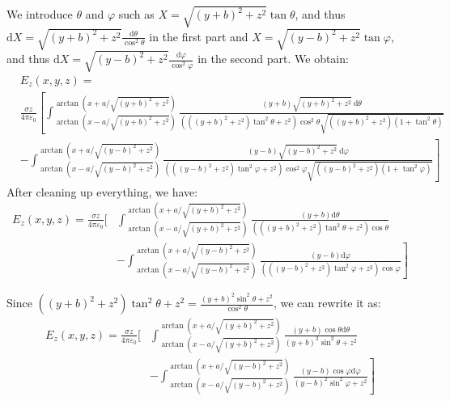 \documentclass[12pt]{article}
\begin{document}
We introduce \(\theta\) and \(\varphi\) such as \(X=\sqrt{(y+b)^2+z^2} \tan \theta\), and thus \(\mathrm{d} X=\sqrt{(y+b)^2+z^2} \frac{\mathrm{d} \theta}{\cos ^2 \theta}\) in the first part and \(X=\sqrt{(y-b)^2+z^2} \tan \varphi\), and thus \(\mathrm{d} X=\sqrt{(y-b)^2+z^2} \frac{\mathrm{d} \varphi}{\cos ^2 \varphi}\) in the second part. We obtain:
\[
\begin{aligned}
& E_z(x, y, z)=\\
&\frac{\sigma z}{4 \pi \varepsilon_0}\left[\int_{\arctan \left(x-a / \sqrt{(y+b)^2+z^2}\right)}^{\arctan \left(x+a / \sqrt{(y+b)^2+z^2}\right)} \frac{(y+b) \sqrt{(y+b)^2+z^2} \mathrm{~d} \theta}{\left(\left((y+b)^2+z^2\right) \tan ^2 \theta+z^2\right) \cos ^2 \theta \sqrt{\left((y+b)^2+z^2\right)\left(1+\tan ^2 \theta\right)}}\right. \\
&\left.-\int_{\arctan \left(x-a / \sqrt{(y-b)^2+z^2}\right)}^{\arctan \left(x+a / \sqrt{(y-b)^2+z^2}\right)} \frac{(y-b) \sqrt{(y-b)^2+z^2} \mathrm{~d} \varphi}{\left(\left((y-b)^2+z^2\right) \tan ^2 \varphi+z^2\right) \cos ^2 \varphi \sqrt{\left((y-b)^2+z^2\right)\left(1+\tan ^2 \varphi\right)}}\right]
\end{aligned}
\]
After cleaning up everything, we have:
\[
\begin{aligned}
E_z(x, y, z)=\frac{\sigma z}{4 \pi \varepsilon_0}[ & \int_{\arctan \left(x-a / \sqrt{(y+b)^2+z^2}\right)}^{\arctan \left(x+a / \sqrt{(y+b)^2+z^2}\right)} \frac{(y+b) \mathrm{d} \theta}{\left(\left((y+b)^2+z^2\right) \tan ^2 \theta+z^2\right) \cos \theta} \\
& \left.-\int_{\arctan \left(x-a / \sqrt{(y-b)^2+z^2}\right)}^{\arctan \left(x+a / \sqrt{(y-b)^2+z^2}\right)} \frac{(y-b) \mathrm{d} \varphi}{\left(\left((y-b)^2+z^2\right) \tan ^2 \varphi+z^2\right) \cos \varphi}\right]
\end{aligned}
\]

Since \(\left((y+b)^2+z^2\right) \tan ^2 \theta+z^2=\frac{(y+b)^2 \sin ^2 \theta+z^2}{\cos ^2 \theta}\), we can rewrite it as:
\[
\begin{aligned}
E_z(x, y, z)=\frac{\sigma z}{4 \pi \varepsilon_0}[ & \int_{\arctan \left(x-a / \sqrt{(y+b)^2+z^2}\right)}^{\arctan \left(x+a / \sqrt{(y+b)^2+z^2}\right)} \frac{(y+b) \cos \theta \mathrm{d} \theta}{(y+b)^2 \sin ^2 \theta+z^2} \\
& \left.-\int_{\arctan \left(x-a / \sqrt{(y-b)^2+z^2}\right)}^{\arctan \left(x+a / \sqrt{(y-b)^2+z^2}\right)} \frac{(y-b) \cos \varphi \mathrm{d} \varphi}{(y-b)^2 \sin ^2 \varphi+z^2}\right]
\end{aligned}
\]
\end{document}
